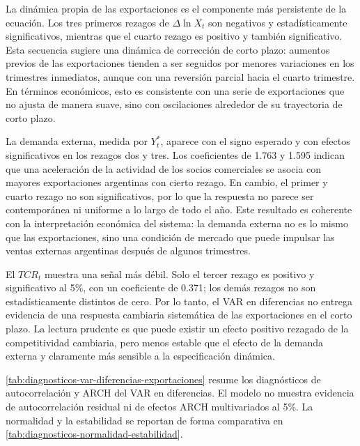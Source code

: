 \documentclass[11pt,a4paper]{article}
\begin{document}
	La dinámica propia de las exportaciones es el componente más persistente de la
	ecuación. Los tres primeros rezagos de \(\Delta \ln X_t\) son negativos y
	estadísticamente significativos, mientras que el cuarto rezago es positivo y
	también significativo. Esta secuencia sugiere una dinámica de corrección de
	corto plazo: aumentos previos de las exportaciones tienden a ser seguidos por
	menores variaciones en los trimestres inmediatos, aunque con una reversión
	parcial hacia el cuarto trimestre. En términos económicos, esto es consistente
	con una serie de exportaciones que no ajusta de manera suave, sino con
	oscilaciones alrededor de su trayectoria de corto plazo.
	
	La demanda externa, medida por \(Y_t^*\), aparece con el signo esperado y con
	efectos significativos en los rezagos dos y tres. Los coeficientes de 1.763 y
	1.595 indican que una aceleración de la actividad de los socios comerciales se
	asocia con mayores exportaciones argentinas con cierto rezago. En cambio, el
	primer y cuarto rezago no son significativos, por lo que la respuesta no parece
	ser contemporánea ni uniforme a lo largo de todo el año. Este resultado es
	coherente con la interpretación económica del sistema: la demanda externa no es
	lo mismo que las exportaciones, sino una condición de mercado que puede impulsar
	las ventas externas argentinas después de algunos trimestres.
	
	El \(TCR_t\) muestra una señal más débil. Solo el tercer rezago es positivo y
	significativo al 5\%, con un coeficiente de 0.371; los demás rezagos no son
	estadísticamente distintos de cero. Por lo tanto, el VAR en diferencias no
	entrega evidencia de una respuesta cambiaria sistemática de las exportaciones
	en el corto plazo. La lectura prudente es que puede existir un efecto positivo
	rezagado de la competitividad cambiaria, pero menos estable que el efecto de la
	demanda externa y claramente más sensible a la especificación dinámica.
	
\autoref{tab:diagnosticos-var-diferencias-exportaciones} resume los
diagnósticos de autocorrelación y ARCH del VAR en diferencias. El modelo no
muestra evidencia de autocorrelación residual ni de efectos ARCH multivariados
al 5\%. La normalidad y la estabilidad se reportan de forma comparativa en
\autoref{tab:diagnosticos-normalidad-estabilidad}.
\end{document}
